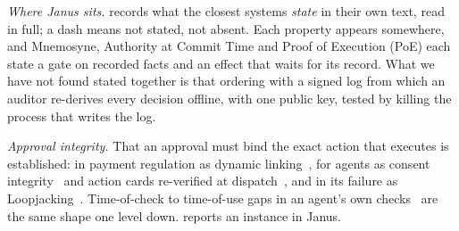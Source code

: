 \emph{Where Janus sits.}  records what the closest systems
\emph{state} in their own text, read in full; a dash means not stated, not
absent. Each property appears somewhere, and Mnemosyne, Authority at Commit Time
and Proof of Execution (PoE) each state a gate on recorded facts and an effect that
waits for its record. What we have not found stated together is that ordering
with a signed log from which an auditor re-derives every decision offline, with
one public key, tested by killing the process that writes the log.

\emph{Approval integrity.} That an approval must bind the exact action that
executes is established: in payment regulation as dynamic
linking~\cite{psd2rts}, for agents as consent integrity~\cite{wyaiwye} and
action cards re-verified at dispatch~\cite{actioncard}, and in its failure as
Loopjacking~\cite{loopjacking}. Time-of-check to time-of-use gaps in an agent's
own checks~\cite{toctouagents,atomicityagents} are the same shape one level
down.  reports an instance in Janus.

